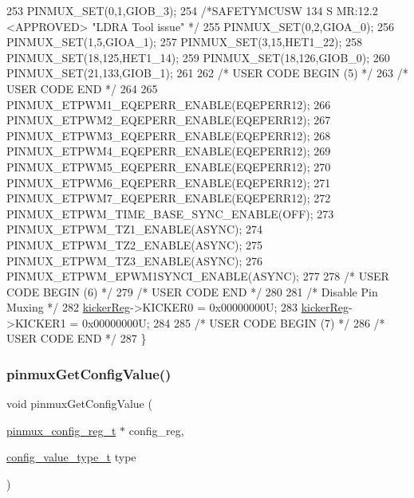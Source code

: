 \begin{DoxyCode}
253     PINMUX\_SET(0,1,GIOB\_3);
254     \textcolor{comment}{/*SAFETYMCUSW 134 S MR:12.2 <APPROVED> "LDRA Tool issue" */}
255     PINMUX\_SET(0,2,GIOA\_0);
256     PINMUX\_SET(1,5,GIOA\_1);
257     PINMUX\_SET(3,15,HET1\_22);
258     PINMUX\_SET(18,125,HET1\_14);
259     PINMUX\_SET(18,126,GIOB\_0);
260     PINMUX\_SET(21,133,GIOB\_1);
261     
262 \textcolor{comment}{/* USER CODE BEGIN (5) */}
263 \textcolor{comment}{/* USER CODE END */}
264 
265     PINMUX\_ETPWM1\_EQEPERR\_ENABLE(EQEPERR12);
266     PINMUX\_ETPWM2\_EQEPERR\_ENABLE(EQEPERR12);
267     PINMUX\_ETPWM3\_EQEPERR\_ENABLE(EQEPERR12);
268     PINMUX\_ETPWM4\_EQEPERR\_ENABLE(EQEPERR12);
269     PINMUX\_ETPWM5\_EQEPERR\_ENABLE(EQEPERR12);
270     PINMUX\_ETPWM6\_EQEPERR\_ENABLE(EQEPERR12);
271     PINMUX\_ETPWM7\_EQEPERR\_ENABLE(EQEPERR12);
272     PINMUX\_ETPWM\_TIME\_BASE\_SYNC\_ENABLE(OFF);
273     PINMUX\_ETPWM\_TZ1\_ENABLE(ASYNC);
274     PINMUX\_ETPWM\_TZ2\_ENABLE(ASYNC);
275     PINMUX\_ETPWM\_TZ3\_ENABLE(ASYNC);
276     PINMUX\_ETPWM\_EPWM1SYNCI\_ENABLE(ASYNC);
277 
278 \textcolor{comment}{/* USER CODE BEGIN (6) */}
279 \textcolor{comment}{/* USER CODE END */}
280     
281     \textcolor{comment}{/* Disable Pin Muxing */}
282     \mbox{\hyperlink{reg__pinmux_8h_a286f3b3064e923c24e41f9f680baf8ce}{kickerReg}}->KICKER0 = 0x00000000U;
283     \mbox{\hyperlink{reg__pinmux_8h_a286f3b3064e923c24e41f9f680baf8ce}{kickerReg}}->KICKER1 = 0x00000000U;
284     
285 \textcolor{comment}{/* USER CODE BEGIN (7) */}
286 \textcolor{comment}{/* USER CODE END */}
287 \}
\end{DoxyCode}
\mbox{\label{group__IOMM_gae1d5925bc43dd10efb0529ed8fea7e5d}} 
\subsubsection{\texorpdfstring{pinmux\+Get\+Config\+Value()}{pinmuxGetConfigValue()}}
{\footnotesize\ttfamily void pinmux\+Get\+Config\+Value (\begin{DoxyParamCaption}\item[{\mbox{\hyperlink{structpinmux__config__reg}{pinmux\+\_\+config\+\_\+reg\+\_\+t}} $\ast$}]{config\+\_\+reg,  }\item[{\mbox{\hyperlink{sys__common_8h_a9daf9a5992391b058477d28d107ee5e2}{config\+\_\+value\+\_\+type\+\_\+t}}}]{type }\end{DoxyParamCaption})}



